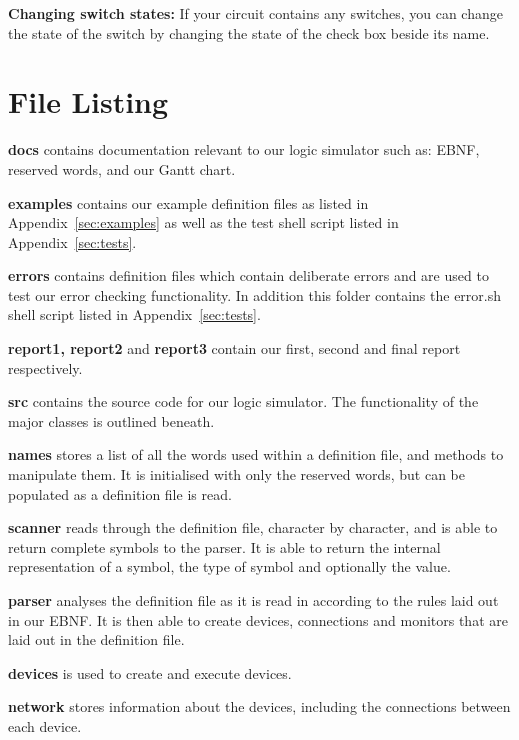 \documentclass[a4paper,10pt]{article}
\begin{document}
\textbf{Changing switch states:} If your circuit contains any  switches, you can change the state of the switch by changing the state of the check box beside its name.

\pagebreak

\section{File Listing}
\setlength{\DTbaselineskip}{15pt}
\DTsetlength{.2em}{3em}{0.1em}{1pt}{4pt}

\textbf{docs} contains documentation relevant to our logic simulator such as: EBNF, reserved words, and our Gantt chart.

\textbf{examples} contains our example definition files as listed in Appendix~\ref{sec:examples} as well as the test shell script listed in Appendix~\ref{sec:tests}.

\textbf{errors} contains definition files which contain deliberate errors and are used to test our error checking functionality. In addition this folder contains the error.sh shell script listed in Appendix~\ref{sec:tests}.

\textbf{report1, report2} and \textbf{report3} contain our first, second and final report respectively.

\textbf{src} contains the source code for our logic simulator. The functionality of the major classes is outlined beneath.

\textbf{names} stores a list of all the words used within a definition file, and methods to manipulate them. It is initialised with only the reserved words, but can be populated as a definition file is read.

\textbf{scanner} reads through the definition file, character by character, and is able to return complete symbols to the parser. It is able to return the internal representation of a symbol, the type of symbol and optionally the value.

\textbf{parser} analyses the definition file as it is read in according to the rules laid out in our EBNF. It is then able to create devices, connections and monitors that are laid out in the definition file.

\textbf{devices} is used to create and execute devices. 

\textbf{network} stores information about the devices, including the connections between each device.
\end{document}

